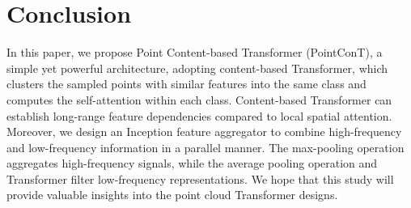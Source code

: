 \documentclass[lettersize,journal]{IEEEtran}
\begin{document}
\section{Conclusion}
In this paper, we propose Point Content-based Transformer (PointConT), a simple yet powerful architecture, 
adopting content-based Transformer, which clusters the sampled points with similar features into the same class and computes the self-attention within each class. 
Content-based Transformer can establish long-range feature dependencies compared to local spatial attention.
Moreover, we design an Inception feature aggregator to combine high-frequency and low-frequency information in a parallel manner. 
The max-pooling operation aggregates high-frequency signals, while the average pooling operation and Transformer filter low-frequency representations.
We hope that this study will provide valuable insights into the point cloud Transformer designs.












\vfill
\end{document}
